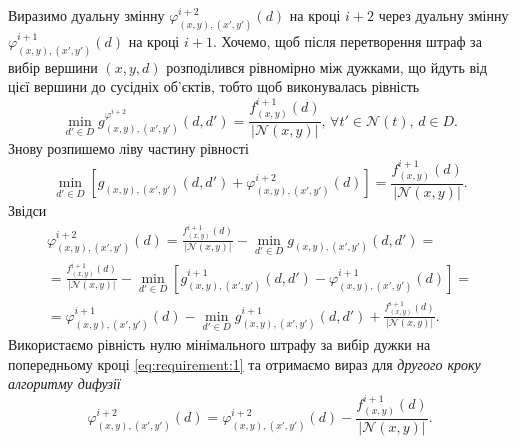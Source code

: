 Виразимо дуальну змінну
$\varphi_{\left(x, y \right), \left(x', y' \right)}^{i + 2} \left( d \right)$
на кроці $i + 2$ через дуальну змінну
$\varphi_{\left(x, y \right), \left(x', y' \right)}^{i + 1} \left( d \right)$
на кроці $i + 1$.
Хочемо, щоб після перетворення штраф за вибір вершини $\left(x, y, d \right)$
розподілився рівномірно між дужками,
що йдуть від цієї вершини до сусідніх об'єктів, тобто щоб виконувалась рівність
\begin{equation*}
    \min \limits_{d' \in D} g_{\left(x, y \right), \left(x', y' \right)}^{\varphi^{i + 2}}
    \left(
        d, d'
    \right) =
    \frac{f_{\left(x, y \right)}^{i + 1} \left(d \right)}{\left| \mathcal{N} \left( x, y \right) \right|}, \,
    \forall t' \in \mathcal{N} \left(t \right), \,
    d \in D.
\end{equation*}
Знову розпишемо ліву частину рівності
\begin{equation*}
    \min \limits_{d' \in D} \left[
        g_{\left(x, y \right), \left(x', y' \right)} \left( d, d' \right) +
        \varphi_{\left(x, y \right), \left(x', y' \right)}^{i + 2} \left(d \right)
    \right] =
    \frac{f_{\left(x, y \right)}^{i + 1} \left(d \right)}{\left| \mathcal{N} \left( x, y \right) \right|}.
\end{equation*}
Звідси
\begin{equation*}
\begin{gathered}
    \varphi_{\left(x, y \right), \left(x', y' \right)}^{i + 2} \left(d \right) =
    \frac{f_{\left(x, y \right)}^{i + 1} \left(d \right)}{\left| \mathcal{N} \left( x, y \right) \right|} -
    \min \limits_{d' \in D}
        g_{\left(x, y \right), \left(x', y' \right)} \left( d, d' \right) = \\
    = \frac{f_{\left(x, y \right)}^{i + 1} \left(d \right)}{\left| \mathcal{N} \left( x, y \right) \right|} -
    \min \limits_{d' \in D} \left[
        g_{\left(x, y \right), \left(x', y' \right)}^{i + 1} \left( d, d' \right) -
        \varphi_{\left(x, y \right), \left(x', y' \right)}^{i + 1} \left(d \right)
    \right] = \\
    = \varphi_{\left(x, y \right), \left(x', y' \right)}^{i + 1} \left(d \right) -
    \min \limits_{d' \in D}
        g_{\left(x, y \right), \left(x', y' \right)}^{i + 1} \left( d, d' \right) +
    \frac{f_{\left(x, y \right)}^{i + 1} \left(d \right)}{\left| \mathcal{N} \left( x, y \right) \right|}.
\end{gathered}
\end{equation*}
Використаємо рівність нулю
мінімального штрафу за вибір дужки на попередньому кроці
\eqref{eq:requirement:1}
та отримаємо вираз для \textit{другого кроку алгоритму дифузії}
\begin{equation*}
    \varphi_{\left(x, y \right), \left(x', y' \right)}^{i + 2} \left(d \right) =
    \varphi_{\left(x, y \right), \left(x', y' \right)}^{i + 2} \left(d \right) -
    \frac{f_{\left(x, y \right)}^{i + 1} \left(d \right)}{\left| \mathcal{N} \left( x, y \right) \right|}.
\end{equation*}


